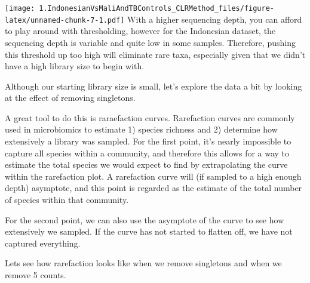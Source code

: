\documentclass[]{article}
\begin{document}
\texttt{[image: 1.IndonesianVsMaliAndTBControls\_CLRMethod\_files/figure-latex/unnamed-chunk-7-1.pdf]}
With a higher sequencing depth, you can afford to play around with
thresholding, however for the Indonesian dataset, the sequencing depth
is variable and quite low in some samples. Therefore, pushing this
threshold up too high will eliminate rare taxa, especially given that we
didn't have a high library size to begin with.

Although our starting library size is small, let's explore the data a
bit by looking at the effect of removing singletons.

A great tool to do this is raraefaction curves. Rarefaction curves are
commonly used in microbiomics to estimate 1) species richness and 2)
determine how extensively a library was sampled. For the first point,
it's nearly impossible to capture all species within a community, and
therefore this allows for a way to estimate the total species we would
expect to find by extrapolating the curve within the rarefaction plot. A
rarefaction curve will (if sampled to a high enough depth) asymptote,
and this point is regarded as the estimate of the total number of
species within that community.

For the second point, we can also use the asymptote of the curve to see
how extensively we sampled. If the curve has not started to flatten off,
we have not captured everything.

Lets see how rarefaction looks like when we remove singletons and when
we remove 5 counts.
\end{document}
